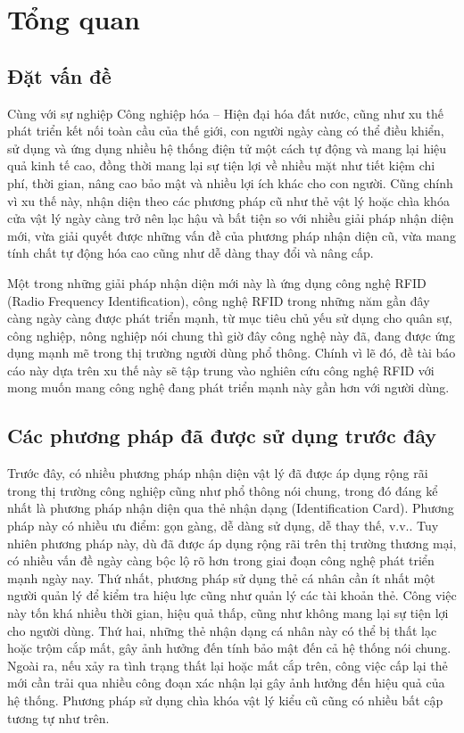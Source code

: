 \chapter{Tổng quan}
\section{Đặt vấn đề}
Cùng với sự nghiệp Công nghiệp hóa -- Hiện đại hóa đất nước, cũng như xu thế phát triển kết nối toàn cầu của thế giới,
con người ngày càng có thể điều khiển, sử dụng và ứng dụng nhiều hệ thống điện tử một cách tự động và mang lại hiệu quả kinh tế cao,
đồng thời mang lại sự tiện lợi về nhiều mặt như tiết kiệm chi phí, thời gian, nâng cao bảo mật và nhiều lợi ích khác cho con người.
Cũng chính vì xu thế này, nhận diện theo các phương pháp cũ như thẻ vật lý hoặc chìa khóa cửa vật lý ngày càng trở nên lạc hậu và bất tiện so với nhiều giải pháp nhận diện mới, vừa giải quyết được những vấn đề của phương pháp nhận diện cũ, vừa mang tính chất tự động hóa cao cũng như dễ dàng thay đổi và nâng cấp.

Một trong những giải pháp nhận diện mới này là ứng dụng công nghệ RFID (Radio Frequency Identification),
công nghệ RFID trong những năm gần đây càng ngày càng được phát triển mạnh, từ mục tiêu chủ yếu sử dụng cho quân sự, công nghiệp, nông nghiệp nói chung thì giờ đây công nghệ này đã, đang được ứng dụng mạnh mẽ trong thị trường người dùng phổ thông.
Chính vì lẽ đó, đề tài báo cáo này dựa trên xu thế này sẽ tập trung vào nghiên cứu công nghệ RFID với mong muốn mang công nghệ đang phát triển mạnh này gần hơn với người dùng.

\section{Các phương pháp đã được sử dụng trước đây}
Trước đây, có nhiều phương pháp nhận diện vật lý đã được áp dụng rộng rãi trong thị trường công nghiệp cũng như phổ thông nói chung,
trong đó đáng kể nhất là phương pháp nhận diện qua thẻ nhận dạng (Identification Card).
Phương pháp này có nhiều ưu điểm: gọn gàng, dễ dàng sử dụng, dễ thay thế, v.v..
Tuy nhiên phương pháp này, dù đã được áp dụng rộng rãi trên thị trường thương mại, có nhiều vấn đề ngày càng bộc lộ rõ hơn trong giai đoạn công nghệ phát triển mạnh ngày nay.
Thứ nhất, phương pháp sử dụng thẻ cá nhân cần ít nhất một người quản lý để kiểm tra hiệu lực cũng như quản lý các tài khoản thẻ.
Công việc này tốn khá nhiều thời gian, hiệu quả thấp, cũng như không mang lại sự tiện lợi cho người dùng.
Thứ hai, những thẻ nhận dạng cá nhân này có thể bị thất lạc hoặc trộm cắp mất,
gây ảnh hưởng đến tính bảo mật đến cả hệ thống nói chung.
Ngoài ra, nếu xảy ra tình trạng thất lại hoặc mất cắp trên, công việc cấp lại thẻ mới cần trải qua nhiều công đoạn xác nhận lại gây ảnh hưởng đến hiệu quả của hệ thống.
Phương pháp sử dụng chìa khóa vật lý kiểu cũ cũng có nhiều bất cập tương tự như trên.


